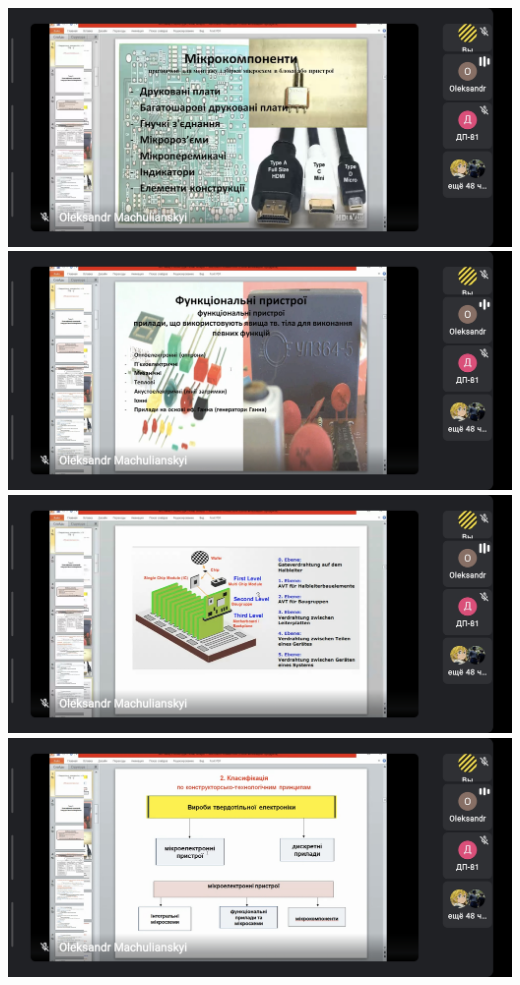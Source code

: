 \documentclass[a4paper,14pt]{extreport}
\begin{document}
\begin{center}
\includegraphics[scale = 0.3]{5.jpg}
\includegraphics[scale = 0.3]{6.jpg}
\includegraphics[scale = 0.3]{7.jpg}
\includegraphics[scale = 0.3]{8.jpg}

\end{center}
\end{document}
